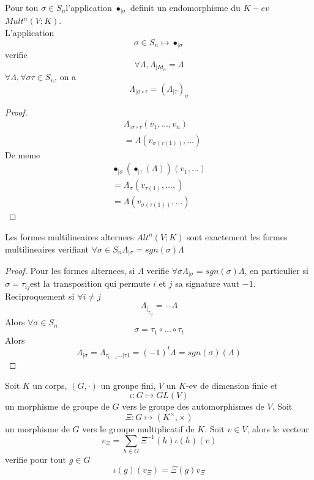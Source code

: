 \documentclass[../main.tex]{subfiles}
\begin{document}
\begin{propo}
	Pour tou $\sigma \in S_{n} $l'application $\bullet_{|\sigma} $ definit un endomorphisme du $K-ev$ $Mult^{n}( V;K) $.\\
	L'application
	\[ 
	\sigma \in S_n \mapsto \bullet_{|\sigma} 
	\]
	verifie
	\[ 
	\forall \Lambda, \Lambda_{|Id_n} = \Lambda
	\]
	$\forall \Lambda, \forall \sigma\tau \in S_n$, on a 
	\[ 
		\Lambda_{|\sigma\circ\tau} = ( \Lambda_{|\tau} )_{\sigma} 
	\]
	
\end{propo}
\begin{proof}
	\begin{align*}
	&\Lambda_{|\sigma\circ\tau} ( v_1, \ldots, v_n) \\
	&=\Lambda( v_{\sigma( \tau( 1) ) }, \ldots ) 
	\end{align*}
	De meme
	\begin{align*}
	\bullet_{|\sigma} ( \bullet_{|\tau} ( \Lambda) ) ( v_1, \ldots) \\
	= \Lambda_\sigma ( v_{\tau( 1) } ,\ldots,) \\
	= \Lambda( v_{\sigma( \tau( 1) ) }, \ldots ) 
	\end{align*}
	

\end{proof}
\begin{thm}
	Les formes multilineaires alternees $Alt^{n}( V;K) $ sont exactement les formes multilineaires verifiant $\forall \sigma \in S_n \Lambda_{|\sigma} = sgn( \sigma) \Lambda$
\end{thm}
\begin{proof}
	Pour les formes alternees, si $\Lambda$ verifie $\forall \sigma \Lambda_{|\sigma} = sgn( \sigma)\Lambda$, en particulier si $\sigma= \tau_{ij} 	$est la transposition qui permute $i$ et $j$ sa signature vaut $-1$.\\
Reciproquement si $\forall i \neq j$ 
\[ 
\Lambda_{|_{\tau_{ij} } } = - \Lambda
\]
Alors $\forall \sigma \in S_n$ 
\[ 
\sigma = \tau_1 \circ \ldots \circ \tau_t
\]
Alors
\[ 
	\Lambda_{|\sigma} = \Lambda_{\tau_{t-1} \ldots|\tau 1} = ( -1) ^{t}\Lambda = sgn( \sigma) ( \Lambda) 
\]


\end{proof}
\begin{thm}
	Soit $K$ un corps, $( G,\cdot) $ un groupe fini, $V$ un $K$-ev de dimension finie et 
	\[ 
		\iota: G \mapsto GL( V) 
	\]
	un morphisme de groupe de $G$ vers le groupe des automorphismes de $V$. Soit
	\[ 
		\Xi: G \mapsto ( K^{\times}, \times) 
	\]
	un morphisme de $G$ vers le groupe multiplicatif de $K$. Soit $v \in V$, alors le vecteur
	\[ 
		v_{\Xi} = \sum_{h \in G} \Xi^{-1}( h) \iota( h) ( v) 
	\]
	verifie pour tout $g \in G$ 
	\[ 
		\iota( g) ( v_{\Xi} ) = \Xi( g) v_{\Xi} 
	\]
	
\end{thm}
\end{document}
